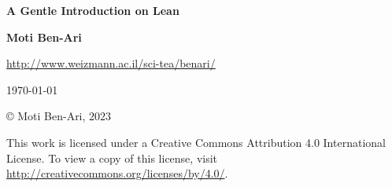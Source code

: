 
\thispagestyle{empty}

\begin{center}
\textbf{\LARGE A Gentle Introduction on Lean}

\bigskip
\bigskip
\bigskip

\textbf{\Large Moti Ben-Ari}

\bigskip

\url{http://www.weizmann.ac.il/sci-tea/benari/}

\bigskip
\bigskip

\today

\end{center}

\vfill

\begin{center}
\copyright{} Moti Ben-Ari, $2023$
\end{center}
 
\begin{small}
This work is licensed under a Creative Commons Attribution 4.0 International License. To view a copy of this license, visit \url{http://creativecommons.org/licenses/by/4.0/}.
\end{small}

\newpage

\tableofcontents
